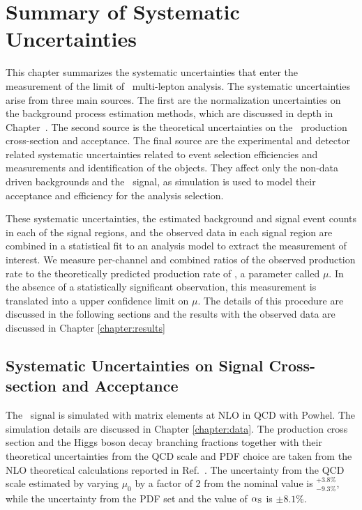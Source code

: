 \chapter[Summary of Systematic Uncertainties][Summary of Systematic Uncertainties]{Summary of Systematic Uncertainties}
\label{chapter:systematics} 

This chapter summarizes the systematic uncertainties that enter the measurement of the limit of \tth\ multi-lepton analysis. The systematic uncertainties arise from three main sources. The first are the normalization uncertainties on the background process estimation methods, which are discussed in depth in Chapter~\label{chapter:background}. The second source is the theoretical uncertainties on the \tth\ production cross-section and acceptance. The final source are the experimental and detector related systematic uncertainties related to event selection efficiencies and measurements and identification of the objects. They affect only the non-data driven backgrounds and the \tth\ signal, as simulation is used to model their acceptance and efficiency for the analysis selection. 

These systematic uncertainties, the estimated background and signal event counts in each of the signal regions, and the observed data in each signal region are combined in a statistical fit to an analysis model to extract the measurement of interest. We measure per-channel and combined ratios of the observed production rate to the theoretically predicted production rate of \tth, a parameter called $\mu$. In the absence of a statistically significant observation, this measurement is translated into a upper confidence limit
on $\mu$. The details of this procedure are discussed in the following sections and the results with the observed data are discussed in Chapter \ref{chapter:results}

\section{Systematic Uncertainties on Signal Cross-section and Acceptance}
\label{section:tth}
The \tth\ signal is simulated with matrix elements at NLO in QCD with {\textsc Powhel}. The simulation details are discussed in Chapter \ref{chapter:data}. The production cross section and the Higgs boson decay branching fractions together with their theoretical uncertainties from the QCD scale and PDF choice are taken from the NLO theoretical calculations reported in Ref.~\cite{Heinemeyer:2013tqa}. The uncertainty from the QCD scale estimated by varying $\mu_{0}$ by a factor of 2 from the nominal value is $^{+3.8\%}_{-9.3\%}$, while the uncertainty from the PDF set and the value of $\alpha_{\rm S}$ is $\pm 8.1\%$.

